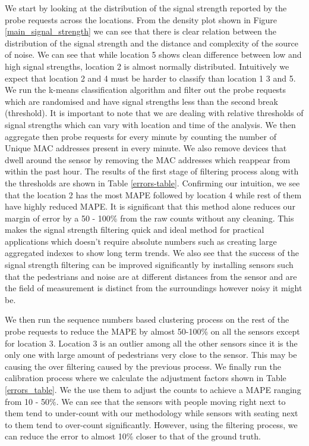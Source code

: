 We start by looking at the distribution of the signal strength reported by the probe requests across the locations. From the density plot shown in Figure \ref{main_signal_strength} we can see that there is clear relation between the distribution of the signal strength and the distance and complexity of the source of noise. We can see that while location 5 shows clean difference between low and high signal strengths, location 2 is almost normally distributed.
Intuitively we expect that location 2 and 4 must be harder to classify than location 1 3 and 5. 
We run the k-means classification algorithm and filter out the probe requests which are randomised and have signal strengths less than the second break (threshold). 
It is important to note that we are dealing with relative thresholds of signal strengths which can vary with location and time of the analysis.
We then aggregate then probe requests for every minute by counting the number of Unique MAC addresses present in every minute. We also remove devices that dwell around the sensor by removing the MAC addresses which reappear from within the past hour.
The results of the first stage of filtering process along with the thresholds are shown in Table \ref{errors-table}. Confirming our intuition, we see that the location 2 has the most MAPE followed by location 4 while rest of them have highly reduced MAPE.
It is significant that this method alone reduces our margin of error by a 50 - 100\% from the raw counts without any cleaning.
This makes the signal strength filtering quick and ideal method for practical applications which doesn't require absolute numbers such as creating large aggregated indexes to show long term trends. 
We also see that the success of the signal strength filtering can be improved significantly by installing sensors such that the pedestrians and noise are at different distances from the sensor and are the field of measurement is distinct from the surroundings however noisy it might be.

We then run the sequence numbers based clustering process on the rest of the probe requests to reduce the MAPE by almost 50-100\% on all the sensors except for location 3.
Location 3 is an outlier among all the other sensors since it is the only one with large amount of pedestrians very close to the sensor.
This may be causing the over filtering caused by the previous process.
We finally run the calibration process where we calculate the adjustment factors shown in Table \ref{errors_table}.
We the use them to adjust the counts to achieve a MAPE ranging from 10 - 50\%. We can see that the sensors with people moving right next to them tend to under-count with our methodology while sensors with seating next to them tend to over-count significantly. However, using the filtering process, we can reduce the error to almost 10\% closer to that of the ground truth.

